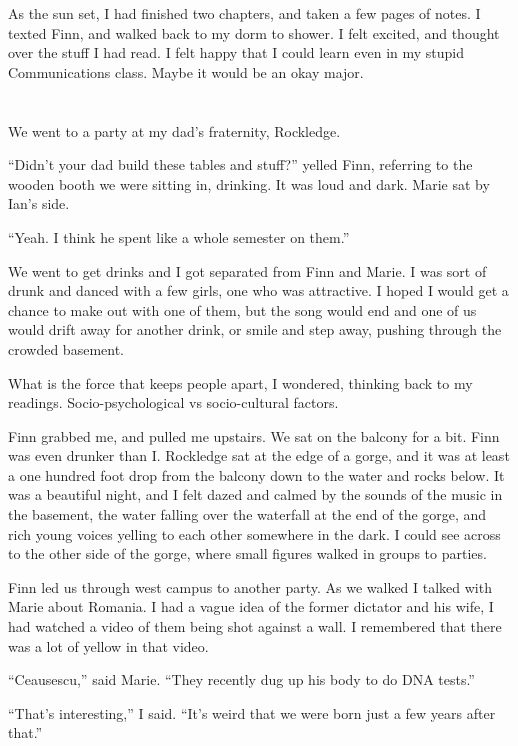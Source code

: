 As the sun set, I had finished two chapters, and taken a few pages of notes.  I
texted Finn, and walked back to my dorm to shower.  I felt excited, and thought
over the stuff I had read.  I felt happy that I could learn even in my stupid
Communications class.  Maybe it would be an okay major.

\section{}

We went to a party at my dad's fraternity, Rockledge.  

``Didn't your dad build these tables and stuff?'' yelled Finn, referring to the
wooden booth we were sitting in, drinking.  It was loud and dark.  Marie sat by
Ian's side.  

``Yeah.  I think he spent like a whole semester on them.''

We went to get drinks and I got separated from Finn and Marie.  I was sort of
drunk and danced with a few girls, one who was attractive.  I hoped I would get
a chance to make out with one of them, but the song would end and one of us
would drift away for another drink, or smile and step away, pushing through the
crowded basement.  

What is the force that keeps people apart, I wondered, thinking back to my
readings.  Socio-psychological vs socio-cultural factors.  

Finn grabbed me, and pulled me upstairs.  We sat on the balcony for a bit.  Finn
was even drunker than I.  Rockledge sat at the edge of a gorge, and it was at
least a one hundred foot drop from the balcony down to the water and rocks
below.  It was a beautiful night, and I felt dazed and calmed by the sounds of
the music in the basement, the water falling over the waterfall at the end of
the gorge, and rich young voices yelling to each other somewhere in the dark.  I
could see across to the other side of the gorge, where small figures walked in
groups to parties.

Finn led us through west campus to another party.  As we walked I talked with
Marie about Romania.  I had a vague idea of the former dictator and his wife, I
had watched a video of them being shot against a wall.  I remembered that there
was a lot of yellow in that video.  

``Ceausescu,'' said Marie.  ``They recently dug up his body to do DNA tests.''  

``That's interesting,'' I said.  ``It's weird that we were born just a few years
after that.''  

